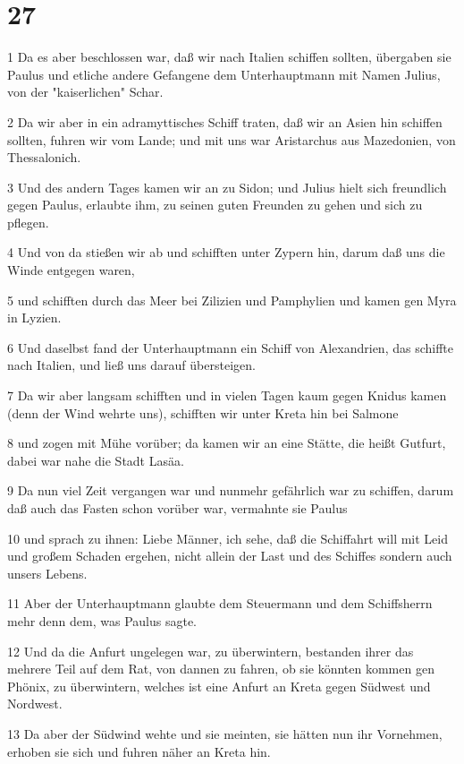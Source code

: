 \chapter{27}

\par 1 Da es aber beschlossen war, daß wir nach Italien schiffen sollten, übergaben sie Paulus und etliche andere Gefangene dem Unterhauptmann mit Namen Julius, von der "kaiserlichen" Schar.
\par 2 Da wir aber in ein adramyttisches Schiff traten, daß wir an Asien hin schiffen sollten, fuhren wir vom Lande; und mit uns war Aristarchus aus Mazedonien, von Thessalonich.
\par 3 Und des andern Tages kamen wir an zu Sidon; und Julius hielt sich freundlich gegen Paulus, erlaubte ihm, zu seinen guten Freunden zu gehen und sich zu pflegen.
\par 4 Und von da stießen wir ab und schifften unter Zypern hin, darum daß uns die Winde entgegen waren,
\par 5 und schifften durch das Meer bei Zilizien und Pamphylien und kamen gen Myra in Lyzien.
\par 6 Und daselbst fand der Unterhauptmann ein Schiff von Alexandrien, das schiffte nach Italien, und ließ uns darauf übersteigen.
\par 7 Da wir aber langsam schifften und in vielen Tagen kaum gegen Knidus kamen (denn der Wind wehrte uns), schifften wir unter Kreta hin bei Salmone
\par 8 und zogen mit Mühe vorüber; da kamen wir an eine Stätte, die heißt Gutfurt, dabei war nahe die Stadt Lasäa.
\par 9 Da nun viel Zeit vergangen war und nunmehr gefährlich war zu schiffen, darum daß auch das Fasten schon vorüber war, vermahnte sie Paulus
\par 10 und sprach zu ihnen: Liebe Männer, ich sehe, daß die Schiffahrt will mit Leid und großem Schaden ergehen, nicht allein der Last und des Schiffes sondern auch unsers Lebens.
\par 11 Aber der Unterhauptmann glaubte dem Steuermann und dem Schiffsherrn mehr denn dem, was Paulus sagte.
\par 12 Und da die Anfurt ungelegen war, zu überwintern, bestanden ihrer das mehrere Teil auf dem Rat, von dannen zu fahren, ob sie könnten kommen gen Phönix, zu überwintern, welches ist eine Anfurt an Kreta gegen Südwest und Nordwest.
\par 13 Da aber der Südwind wehte und sie meinten, sie hätten nun ihr Vornehmen, erhoben sie sich und fuhren näher an Kreta hin.
